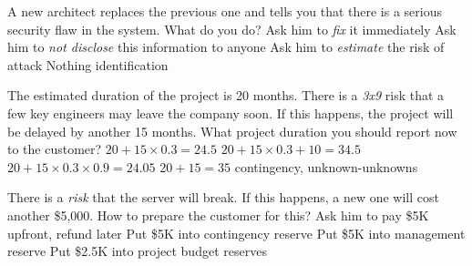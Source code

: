 \documentclass{article}
\begin{document}
\pmbaQuestion
  {A new architect replaces the previous one and tells you that there is a serious security flaw in the system. What do you do?}
  {Ask him to \emph{fix} it immediately}
  {Ask him to \emph{not disclose} this information to anyone}
  {Ask him to \emph{estimate} the risk of attack}
  {Nothing}
  {identification}

\pmbaQuestion
  {The estimated duration of the project is 20 months. There is a \emph{3x9} risk that a few key engineers may leave the company soon. If this happens, the project will be delayed by another 15 months. What project duration you should report now to the customer?}
  {\(20 + 15 \times 0.3 = 24.5\)}
  {\(20 + 15 \times 0.3 + 10 = 34.5\)}
  {\(20 + 15 \times 0.3 \times 0.9 = 24.05\)}
  {\(20 + 15 = 35\)}
  {contingency, unknown-unknowns}

\pmbaQuestion
  {There is a \emph{risk} that the server will break. If this happens, a new one will cost another \$5,000. How to prepare the customer for this?}
  {Ask him to pay \$5K upfront, refund later}
  {Put \$5K into contingency reserve}
  {Put \$5K into management reserve}
  {Put \$2.5K into project budget}
  {reserves}


\end{document}
